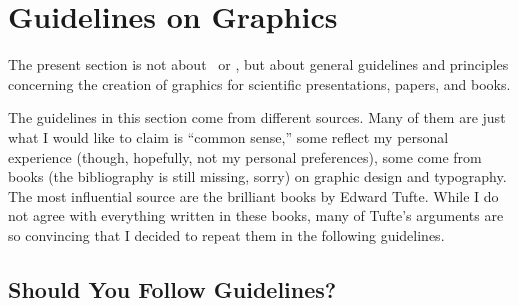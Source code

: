 
%



\section{Guidelines on Graphics}

The present section is not about \pgfname\ or \tikzname, but about
general guidelines and principles concerning the creation of
graphics for scientific presentations, papers, and books.

The guidelines in this section come from different sources. Many of
them are just what I would like to claim is ``common sense,'' some
reflect my personal experience (though, hopefully, not my personal
preferences), some come from books (the bibliography is still missing,
sorry) on graphic design and typography. 
The most influential source  are the brilliant books
by Edward Tufte. While I do not agree with everything written in these
books, many of Tufte's arguments are so convincing that I decided to
repeat them in the following guidelines. 




\subsection{Should You Follow Guidelines?}

